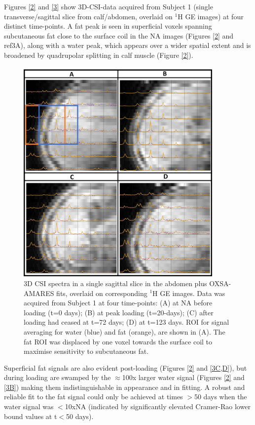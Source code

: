 \documentclass[class=article, crop=false]{standalone}
\begin{document}
Figures \ref{2} and \ref{3} show 3D-CSI-data acquired from Subject 1 (single transverse/sagittal slice from calf/abdomen, overlaid on $^1$H GE images) at four distinct time-points. A fat peak is seen in superficial voxels spanning subcutaneous fat close to the surface coil in the NA images (Figures \ref{2} and ref{3A}), along with a water peak, which appears over a wider spatial extent and is broadened by quadrupolar splitting in calf muscle (Figure \ref{2}). 

\begin{figure}
    \centering
    \includegraphics[width=0.9\textwidth]{Figures/Lipid/Abdomen.png}
    \caption{3D CSI spectra in a single sagittal slice in the abdomen plus OXSA-AMARES fits, overlaid on corresponding $^1$H GE images. Data was acquired from Subject 1 at four time-points: (A) at NA before loading (t=0 days); (B) at peak loading (t=20-days); (C) after loading had ceased at t=72 days; (D) at t=123 days. ROI for signal averaging for water (blue) and fat (orange), are shown in (A). The fat ROI was displaced by one voxel towards the surface coil to maximise sensitivity to subcutaneous fat.}
    \label{fig:Lip:Abdomen}
\end{figure}

Superficial fat signals are also evident post-loading (Figures \ref{2} and \ref{3C,D}), but during loading are swamped by the $\approx$100x larger water signal (Figures \ref{2} and \ref{3B}) making them indistinguishable in appearance and in fitting. A robust and reliable fit to the fat signal could only be achieved at times $>$50 days when the water signal was $<$10xNA (indicated by significantly elevated Cramer-Rao lower bound values at t$<$50 days).
\end{document}
